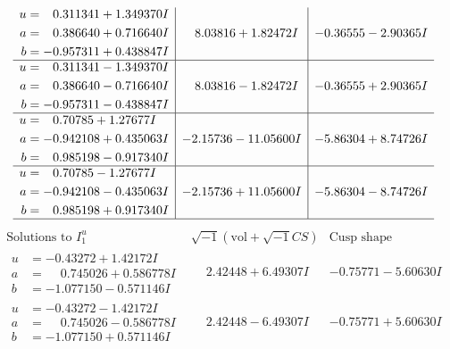 \documentclass[1p]{elsarticle_modified}
\theoremstyle{definition}
\newcommand{\I}{\sqrt{-1}}
\begin{document}
$$\begin{array}{c|c|c}
\begin{aligned}
u &= \phantom{-}0.311341 + 1.349370 I \\
a &= \phantom{-}0.386640 + 0.716640 I \\
b &= -0.957311 + 0.438847 I\end{aligned}
 & \phantom{-}8.03816 + 1.82472 I & -0.36555 - 2.90365 I \\ \hline\begin{aligned}
u &= \phantom{-}0.311341 - 1.349370 I \\
a &= \phantom{-}0.386640 - 0.716640 I \\
b &= -0.957311 - 0.438847 I\end{aligned}
 & \phantom{-}8.03816 - 1.82472 I & -0.36555 + 2.90365 I \\ \hline\begin{aligned}
u &= \phantom{-}0.70785 + 1.27677 I \\
a &= -0.942108 + 0.435063 I \\
b &= \phantom{-}0.985198 - 0.917340 I\end{aligned}
 & -2.15736 - 11.05600 I & -5.86304 + 8.74726 I \\ \hline\begin{aligned}
u &= \phantom{-}0.70785 - 1.27677 I \\
a &= -0.942108 - 0.435063 I \\
b &= \phantom{-}0.985198 + 0.917340 I\end{aligned}
 & -2.15736 + 11.05600 I & -5.86304 - 8.74726 I\\
 \hline 
 \end{array}$$\newpage$$\begin{array}{c|c|c}  
\text{Solutions to }I^u_{1}& \I (\text{vol} + \sqrt{-1}CS) & \text{Cusp shape}\\
 \hline 
\begin{aligned}
u &= -0.43272 + 1.42172 I \\
a &= \phantom{-}0.745026 + 0.586778 I \\
b &= -1.077150 - 0.571146 I\end{aligned}
 & \phantom{-}2.42448 + 6.49307 I & -0.75771 - 5.60630 I \\ \hline\begin{aligned}
u &= -0.43272 - 1.42172 I \\
a &= \phantom{-}0.745026 - 0.586778 I \\
b &= -1.077150 + 0.571146 I\end{aligned}
 & \phantom{-}2.42448 - 6.49307 I & -0.75771 + 5.60630 I \\ \hline\begin{aligned}

\end{aligned}
\end{array}$$
\end{document}
